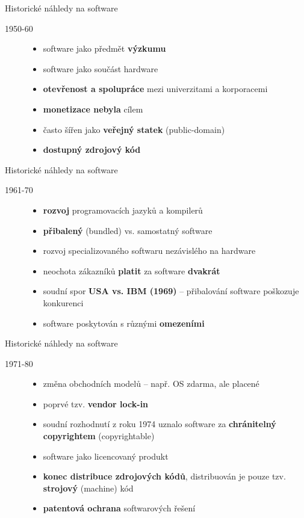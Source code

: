 \documentclass[11pt]{beamer}
\begin{document}
	\begin{frame}{Historické náhledy na software}
		\begin{description}
			\item[1950-60]
			  \begin{itemize}
			  	\item software jako předmět \textbf{výzkumu}
			  	\item software jako součást hardware
			  	\item \textbf{otevřenost a spolupráce} mezi univerzitami a korporacemi
			  	\item \textbf{monetizace nebyla} cílem
			  	\item často šířen jako \textbf{veřejný statek} (public-domain)
			  	\item \textbf{dostupný zdrojový kód}
			  \end{itemize}
		\end{description}
	\end{frame}

	\begin{frame}{Historické náhledy na software}
	\begin{description}
		\item[1961-70]
		\begin{itemize}
			\item \textbf{rozvoj} programovacích jazyků a kompilerů
			\item \textbf{přibalený} (bundled) vs. samostatný software
			\item rozvoj specializovaného softwaru nezávislého na hardware
			\item neochota zákazníků \textbf{platit} za software \textbf{dvakrát}
			\item soudní spor \textbf{USA vs. IBM (1969)} -- přibalování software poškozuje konkurenci
			\item software poskytován s různými \textbf{omezeními}
		\end{itemize}
	\end{description}
	\end{frame}

	\begin{frame}{Historické náhledy na software}
	\begin{description}
		\item[1971-80]
		\begin{itemize}
			\item změna obchodních modelů -- např. OS zdarma, ale placené 
			\item poprvé tzv. \textbf{vendor lock-in}
			\item soudní rozhodnutí z roku 1974 uznalo software za \textbf{chránitelný copyrightem} (copyrightable)
			\item software jako licencovaný produkt
			\item \textbf{konec distribuce zdrojových kódů}, distribuován je pouze tzv. \textbf{strojový} (machine) kód
			\item \textbf{patentová ochrana} softwarových řešení
		\end{itemize}
	\end{description}
	\end{frame}
\end{document}
